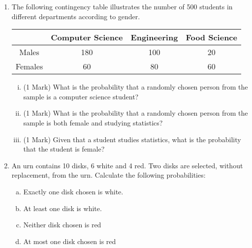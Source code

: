 \documentclass[a4paper,12pt]{article}
\begin{document}
\begin{enumerate}

\item The following contingency table illustrates the number of 500 students in different
departments according to gender.

\begin{center}
\begin{tabular}{|c|c|c|c|}
  \hline
   & Computer Science & Engineering & Food Science \\\hline
  Males & 180 & 100 & 20  \\  \hline
  Females & 60 & 80 & 60  \\ \hline

  \hline
\end{tabular}
\end{center}

\begin{enumerate}[(i)]
\item (1 Mark) What is the probability that a randomly chosen person from the sample is a
computer science student?
\item (1 Mark) What is the probability that a randomly chosen person from the sample is both female and studying statistics?
\item (1 Mark) Given that a student studies statistics, what is the probability that the student is female?
\end{enumerate}



\item 
 An urn contains 10 disks, 6 white and 4 red.  Two disks are selected, without replacement, from the urn.  Calculate the following probabilities: 
\begin{enumerate}[(a)]
 \item Exactly one disk chosen is white. 
 \item At least one disk is white. 
 \item Neither disk chosen is red 
 \item At most one disk chosen is red 
 \end{enumerate} 


\end{enumerate}
\end{document}

